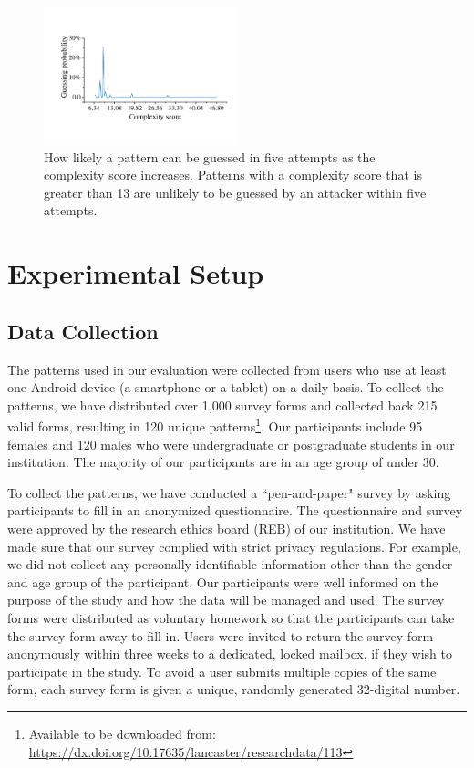 
        \begin{figure}[!t]
            \centering
            \includegraphics[width=0.5\textwidth]{fig/guess_prob.pdf}
            \caption{How likely a pattern can be guessed in five attempts as the complexity score increases. Patterns with a complexity score that is greater than 13 are
             unlikely to be guessed by an attacker within five attempts.}
            \label{fig:guessing-probability}
        \end{figure}

\section{Experimental Setup \label{sec:setup}}
    \subsection{Data Collection}
    \label{section:locking patterns}
    The patterns used in our evaluation were collected from users who use at least one Android device (a smartphone or a tablet) on a daily basis.
    To collect the patterns, we have distributed over 1,000 survey forms and collected back 215 valid forms, resulting in 120 unique patterns\footnote{Available to be downloaded from: \url{https://dx.doi.org/10.17635/lancaster/researchdata/113}}.
    Our participants include 95 females and 120 males who were undergraduate or postgraduate students in our institution.
    The majority of our participants are in an age group of under 30.


    To collect the patterns, we have conducted a ``pen-and-paper" survey by asking participants to fill in an anonymized questionnaire.
    The questionnaire and survey were approved by the research ethics board (REB) of our institution.
    We have made sure that our survey complied with strict privacy regulations. For example, we did not collect any personally identifiable information other than the gender and age group of the participant. Our participants were well informed on the purpose
    of the study and how the data will be managed and used. The survey forms were distributed as voluntary homework so that the participants can take the survey form away to fill in.
     Users were invited to return the survey form anonymously within three weeks to a dedicated, locked mailbox, if they wish to participate in the study.
     To avoid a user submits multiple copies of the same form, each survey form is given a unique, randomly generated 32-digital number.


